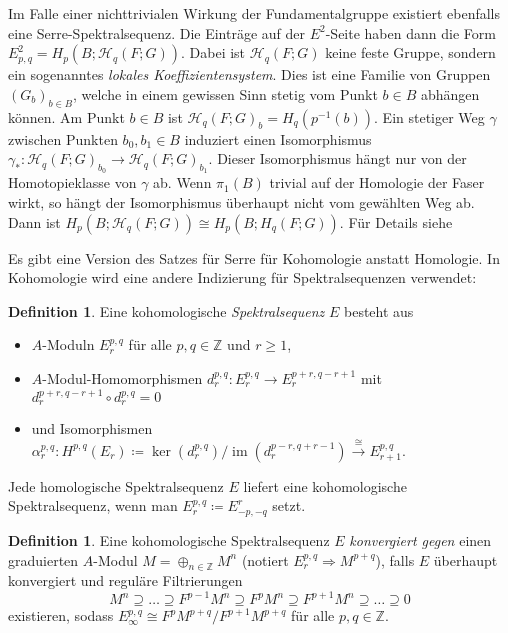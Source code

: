 \documentclass[11pt, a4paper, german]{article}
\theoremstyle{definition}
\newtheorem{defn}[lem]{Definition}
\theoremstyle{remark}
\newcommand{\Z}{\mathbb{Z}} %
\DeclareMathOperator{\im}{im} %
\newcommand{\LH}{\mathcal{H}} %
\begin{document}
Im Falle einer nichttrivialen Wirkung der Fundamentalgruppe existiert ebenfalls eine Serre-Spektralsequenz.
Die Einträge auf der $E^2$-Seite haben dann die Form $E^2_{p,q} = H_p(B; \LH_q(F; G))$.
Dabei ist $\LH_q(F; G)$ keine feste Gruppe, sondern ein sogenanntes \emph{lokales Koeffizientensystem}.
Dies ist eine Familie von Gruppen $(G_b)_{b \in B}$, welche in einem gewissen Sinn stetig vom Punkt $b \in B$ abhängen können.
Am Punkt $b \in B$ ist $\LH_q(F; G)_b = H_q(p^{-1}(b))$.
Ein stetiger Weg $\gamma$ zwischen Punkten $b_0, b_1 \in B$ induziert einen Isomorphismus $\gamma_* : \LH_q(F; G)_{b_0} \to \LH_q(F; G)_{b_1}$.
Dieser Isomorphismus hängt nur von der Homotopieklasse von $\gamma$ ab.
Wenn $\pi_1(B)$ trivial auf der Homologie der Faser wirkt, so hängt der Isomorphismus überhaupt nicht vom gewählten Weg ab.
Dann ist $H_p(B; \LH_q(F; G)) \cong H_p(B; H_q(F; G))$.
Für Details siehe \cite[133-185]{mccleary:ss}

Es gibt eine Version des Satzes für Serre für Kohomologie anstatt Homologie.
In Kohomologie wird eine andere Indizierung für Spektralsequenzen verwendet:

\begin{defn}
  Eine kohomologische \emph{Spektralsequenz} $E$ besteht aus
  \begin{itemize}
    \item $A$-Moduln $E_r^{p,q}$ für alle $p, q \in \Z$ und $r \geq 1$,
    \item $A$-Modul-Homomorphismen $d_r^{p,q} : E_r^{p,q} \to E_r^{p+r,q-r+1}$ mit $d_r^{p+r,q-r+1} \circ d_r^{p,q} = 0$
    \item und Isomorphismen $\alpha_r^{p,q} : H^{p,q}(E_r) \!\coloneqq\! \ker(d_r^{p,q}) / \im(d_r^{p-r,q+r-1}) \xrightarrow{\cong} E_{r+1}^{p,q}$.
  \end{itemize}
\end{defn}

Jede homologische Spektralsequenz $E$ liefert eine kohomologische Spektralsequenz, wenn man $E_r^{p,q} \coloneqq E^r_{-p,-q}$ setzt.

\begin{defn}
  Eine kohomologische Spektralsequenz $E$ \emph{konvergiert gegen} einen graduierten $A$-Modul $M = \oplus_{n \in \Z} M^n$ (notiert $E_r^{p,q} \Rightarrow M^{p+q}$), falls $E$ überhaupt konvergiert und reguläre Filtrierungen
  \[ M^n \supseteq \ldots \supseteq F^{p-1} M^n \supseteq F^p M^n \supseteq F^{p+1} M^n \supseteq \ldots \supseteq 0 \]
  existieren, sodass $E_\infty^{p,q} \cong F^p M^{p+q} / F^{p+1} M^{p+q}$ für alle $p, q \in \Z$.
\end{defn}
\end{document}

